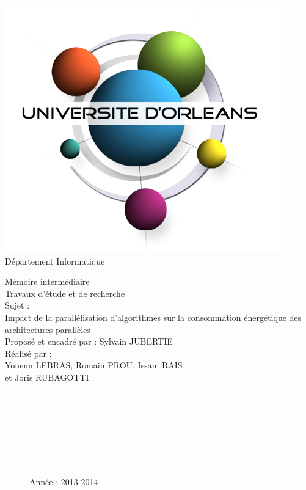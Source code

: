 \documentclass[12pt,a4paper,utf8x]{report}
\begin{document}
\begin{titlepage}
\begin{flushright}
   	\includegraphics[scale=0.30]{images/univorleans.png}\\ 
   	   	Département Informatique
\end{flushright}
\vspace{30mm}
\begin{center}
\huge{Mémoire intermédiaire \\Travaux d'étude et de recherche }\\
\vspace{7mm}
\large{Sujet : \\Impact de la parallélisation d'algorithmes sur la consommation
énergétique des architectures parallèles}\\
\vspace{4mm}
\large{Proposé et encadré par : Sylvain JUBERTIE}
\vspace{4mm}
\large{\\Réalisé par :}\\
\large{Youenn LEBRAS, Romain PROU, Issam RAIS \\ et Joris RUBAGOTTI }\\
\end{center}
\begin{figure}[b!]
\begin{flushright}
~~\\ ~~\\ ~~\\ ~~\\ ~~\\ ~~\\ ~~\\
\large{Année : 2013-2014}
\end{flushright}
\end{figure}
\end{titlepage}

\tableofcontents
\clearpage









\end{document}
